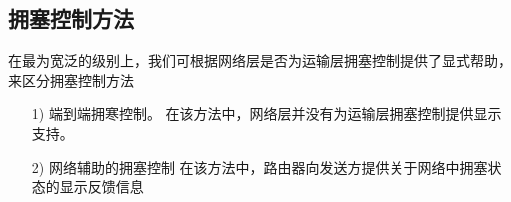 \subsection{拥塞控制方法}

    在最为宽泛的级别上，我们可根据网络层是否为运输层拥塞控制提供了显式帮助，来区分拥塞控制方法

\begin{itemize}
    \item [1)] 端到端拥寒控制。
    \subitem 在该方法中，网络层并没有为运输层拥塞控制提供显示支持。
    \item [2)] 网络辅助的拥塞控制
    \subitem 在该方法中，路由器向发送方提供关于网络中拥塞状态的显示反馈信息
\end{itemize}

